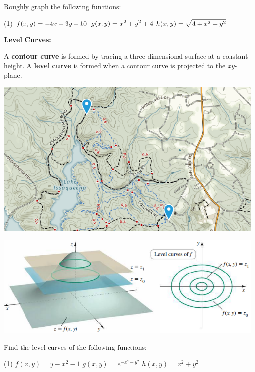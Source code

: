 \documentclass[../mathNotesPreamble]{subfiles}
\begin{document}
  \begin{ex*}
    Roughly graph the following functions:
  \end{ex*}
  \begin{tasks}[after-item-skip=\stretch{1}, label=](1)
    \task $\displaystyle f(x,y)=-4x+3y-10$
    \task $\displaystyle g(x,y)=x^2+y^2+4$
    \task $\displaystyle h(x,y)=\sqrt{4+x^2+y^2}$
  \end{tasks}
  \pagebreak

  \textbf{Level Curves:}

  A \textbf{contour curve} is formed by tracing a three-dimensional surface at a constant height. A \textbf{level curve} is formed when a contour curve is projected to the $xy$-plane.
  \begin{center}
    \includegraphics[width=0.75\linewidth]{../images/cuExperForestTopoMap}
  \end{center}

  \begin{center}
    \includegraphics[width=0.8\linewidth]{../images/briggs_15_01/fig15_10}
  \end{center}
  \pagebreak

  \begin{ex*}
    Find the level curves of the following functions:
  \end{ex*}
  \begin{tasks}[after-item-skip=\stretch{1}, label=](1)
    \task $f(x,y)=y-x^2-1$
    \task $g(x,y)=e^{-x^2-y^2}$
    \task $h(x,y)=x^2+y^2$
  \end{tasks}
  \pagebreak
\end{document}
